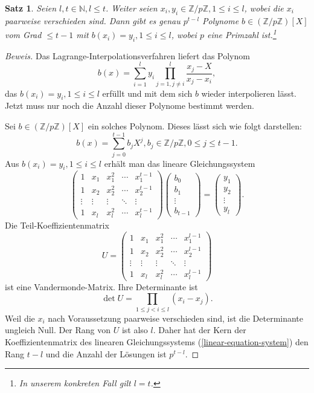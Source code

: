 \documentclass[12pt, a4paper, oneside, titlepage]{report}
\newcommand{\Z}{\mathds{Z}}
\newcommand{\N}{\mathds{N}}
\newtheorem{satz}[lemma]{Satz}
\newenvironment{bew}{\begin{proof}[Beweis]}{\end{proof}}
\theoremstyle{definition}
\begin{document}
	\begin{satz}\label{multiple-polynoms-sentence}
		Seien $ l, t \in \N, l \leq t $. Weiter seien $ x_i, y_i \in \Z / p\Z, 1 \leq i \leq l $, wobei die $ x_i $ paarweise verschieden sind. Dann gibt es genau $ p^{t-l} $ Polynome $ b \in (\Z / p\Z)[X] $ vom Grad $ \leq t - 1 $ mit $ b(x_i) = y_i, 1 \leq i \leq l $, wobei $ p $ eine Primzahl ist.\footnote{In unserem konkreten Fall gilt $ l = t $.}
	\end{satz}
	\begin{bew}
		Das Lagrange-Interpolationsverfahren liefert das Polynom
		$$ b(x) = \sum_{i=1}^{l} y_i \prod_{j=1, j \neq i}^{l} \frac{x_j - X}{x_j - x_i}, $$
		das $ b(x_i) = y_i, 1 \leq i \leq l $ erfüllt und mit dem sich $ b $ wieder interpolieren lässt. Jetzt muss nur noch die Anzahl dieser Polynome bestimmt werden.
		
		Sei $ b \in (\Z / p\Z)[X] $ ein solches Polynom. Dieses lässt sich wie folgt darstellen:
		$$ b(x) = \sum_{j=0}^{t-1} b_j X^j, b_j \in \Z / p\Z, 0 \leq j \leq t-1. $$
		Aus $ b(x_i) = y_i, 1 \leq i \leq l $ erhält man das lineare Gleichungssystem
		\begin{equation}\label{linear-equation-system}
			\begin{pmatrix}
			1 & x_1 & x_1^2 & \cdots & x_1^{t-1} \\
			1 & x_2 & x_2^2 & \cdots & x_2^{t-1} \\
			\vdots & \vdots & \vdots & \ddots & \vdots \\     
			1 & x_l & x_l^2 & \cdots & x_l^{t-1}
			\end{pmatrix}
			\begin{pmatrix}
			b_0 \\
			b_1 \\
			\vdots \\     
			b_{t-1}
			\end{pmatrix}
			=
			\begin{pmatrix}
			y_1 \\
			y_2 \\
			\vdots \\     
			y_l
			\end{pmatrix}.
		\end{equation}		
		Die Teil-Koeffizientenmatrix
		$$ U =
		\begin{pmatrix}
		1 & x_1 & x_1^2 & \cdots & x_1^{l-1} \\
		1 & x_2 & x_2^2 & \cdots & x_2^{l-1} \\
		\vdots & \vdots & \vdots & \ddots & \vdots \\     
		1 & x_l & x_l^2 & \cdots & x_l^{l-1}
		\end{pmatrix} $$
		ist eine Vandermonde-Matrix. Ihre Determinante ist
		$$ \det U = \prod_{1 \leq j < i \leq l} (x_i-x_j). $$
		Weil die $ x_i $ nach Voraussetzung paarweise verschieden sind, ist die Determinante ungleich Null. Der Rang von $ U $ ist also $ l $. Daher hat der Kern der Koeffizientenmatrix des linearen Gleichungssystems (\ref{linear-equation-system}) den Rang $ t-l $ und die Anzahl der Lösungen ist $ p^{t-l} $.
	\end{bew}
	
\end{document}
